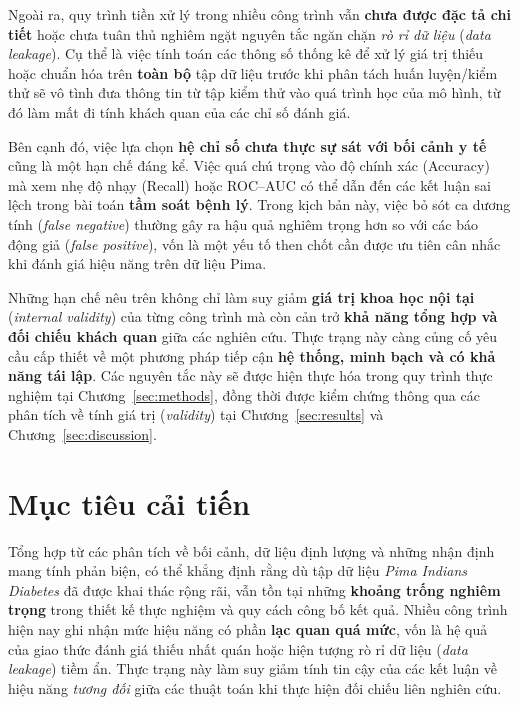 \documentclass[14pt,a4paper]{extreport}
\begin{document}
Ngoài ra, quy trình tiền xử lý trong nhiều công trình vẫn \textbf{chưa được đặc tả chi tiết} hoặc chưa tuân thủ nghiêm ngặt nguyên tắc ngăn chặn \emph{rò rỉ dữ liệu} (\textit{data leakage}). Cụ thể là việc tính toán các thông số thống kê để xử lý giá trị thiếu hoặc chuẩn hóa trên \textbf{toàn bộ} tập dữ liệu trước khi phân tách huấn luyện/kiểm thử sẽ vô tình đưa thông tin từ tập kiểm thử vào quá trình học của mô hình, từ đó làm mất đi tính khách quan của các chỉ số đánh giá.\cite{chang2022pima,pedregosa2011}

Bên cạnh đó, việc lựa chọn \textbf{hệ chỉ số chưa thực sự sát với bối cảnh y tế} cũng là một hạn chế đáng kể. Việc quá chú trọng vào độ chính xác (Accuracy) mà xem nhẹ độ nhạy (Recall) hoặc ROC--AUC có thể dẫn đến các kết luận sai lệch trong bài toán \textbf{tầm soát bệnh lý}. Trong kịch bản này, việc bỏ sót ca dương tính (\textit{false negative}) thường gây ra hậu quả nghiêm trọng hơn so với các báo động giả (\textit{false positive}), vốn là một yếu tố then chốt cần được ưu tiên cân nhắc khi đánh giá hiệu năng trên dữ liệu Pima.\cite{chang2022pima,kirbas2025shap}

Những hạn chế nêu trên không chỉ làm suy giảm \textbf{giá trị khoa học nội tại} (\textit{internal validity}) của từng công trình mà còn cản trở \textbf{khả năng tổng hợp và đối chiếu khách quan} giữa các nghiên cứu. Thực trạng này càng củng cố yêu cầu cấp thiết về một phương pháp tiếp cận \textbf{hệ thống, minh bạch và có khả năng tái lập}. Các nguyên tắc này sẽ được hiện thực hóa trong quy trình thực nghiệm tại Chương~\ref{sec:methods}, đồng thời được kiểm chứng thông qua các phân tích về tính giá trị (\textit{validity}) tại Chương~\ref{sec:results} và Chương~\ref{sec:discussion}.\cite{pedregosa2011}

\section{Mục tiêu cải tiến}

Tổng hợp từ các phân tích về bối cảnh, dữ liệu định lượng và những nhận định mang tính phản biện, có thể khẳng định rằng dù tập dữ liệu \emph{Pima Indians Diabetes} đã được khai thác rộng rãi, vẫn tồn tại những \textbf{khoảng trống nghiêm trọng} trong thiết kế thực nghiệm và quy cách công bố kết quả. Nhiều công trình hiện nay ghi nhận mức hiệu năng có phần \textbf{lạc quan quá mức}, vốn là hệ quả của giao thức đánh giá thiếu nhất quán hoặc hiện tượng rò rỉ dữ liệu (\textit{data leakage}) tiềm ẩn. Thực trạng này làm suy giảm tính tin cậy của các kết luận về hiệu năng \emph{tương đối} giữa các thuật toán khi thực hiện đối chiếu liên nghiên cứu.\cite{chang2022pima,pedregosa2011}
\end{document}
